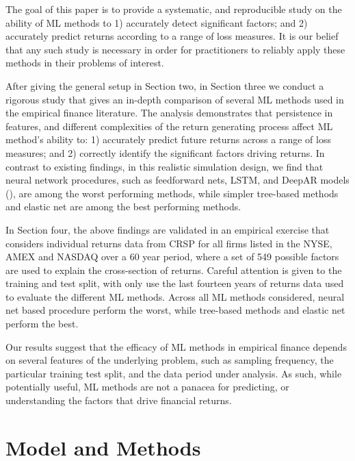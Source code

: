 \documentclass{article}
\begin{document}
The goal of this paper is to provide a systematic, and reproducible study on the ability of ML methods to 1) accurately detect significant factors; and 2) accurately predict returns according to a range of loss measures. It is our belief that any such study is necessary in order for practitioners to reliably apply these methods in their problems of interest. 

After giving the general setup in Section two, in Section three we conduct a rigorous study that gives an in-depth comparison of several ML methods used in the empirical finance literature. The analysis demonstrates that persistence in features, and different complexities of the return generating process affect ML method's ability to: 1) accurately predict future returns across a range of loss measures; and 2) correctly identify the significant factors driving returns. In contrast to existing findings, in this realistic simulation design, we find that neural network procedures, such as feedforward nets, LSTM, and DeepAR models (\cite{salinas_deepar_2019}), are among the worst performing methods, while simpler tree-based methods and elastic net are among the best performing methods. %

In Section four, the above findings are validated in an empirical exercise that considers individual returns data from CRSP for all firms listed in the NYSE, AMEX and NASDAQ over a 60 year period, where a set of 549 possible factors are used to explain the cross-section of returns. Careful attention is given to the training and test split, with only use the last fourteen years of returns data used to evaluate the different ML methods. Across all ML methods considered, neural net based procedure perform the worst, while tree-based methods and elastic net perform the best. 

Our results suggest that the efficacy of ML methods in empirical finance depends on several features of the underlying problem, such as sampling frequency, the particular training test split, and the data period under analysis. As such, while potentially useful, ML methods are not a panacea for predicting, or understanding the factors that drive financial returns. 

\section{Model and Methods}
\end{document}
